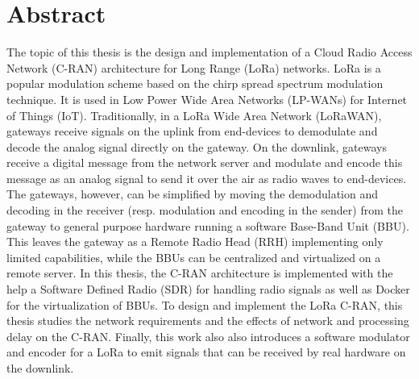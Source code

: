 \chapter*{Abstract}


The topic of this thesis is the design and implementation of a Cloud Radio Access Network (C-RAN) architecture for Long Range (LoRa) networks. 
LoRa is a popular modulation scheme based on the chirp spread spectrum modulation technique. 
It is used in Low Power Wide Area Networks (LP-WANs) for Internet of Things (IoT). 
Traditionally, in a LoRa Wide Area Network (LoRaWAN), gateways receive signals on the uplink from end-devices to demodulate and decode the analog signal directly on the gateway.
On the downlink, gateways receive a digital message from the network server and modulate and encode this message as an analog signal to send it over the air as radio waves to end-devices.
The gateways, however, can be simplified by moving the demodulation and decoding in the receiver (resp. modulation and encoding in the sender) from the gateway to general purpose hardware running a software Base-Band Unit (BBU). 
This leaves the gateway as a Remote Radio Head (RRH) implementing only limited capabilities, while the BBUs can be centralized and virtualized on a remote server.
In this thesis, the C-RAN architecture is implemented with the help a Software Defined Radio (SDR) for handling radio signals as well as Docker for the virtualization of BBUs. 
To design and implement the LoRa C-RAN, this thesis studies the network requirements and the effects of network and processing delay on the C-RAN.
Finally, this work also also introduces a software modulator and encoder for a LoRa to emit signals that can be received by real hardware on the downlink. 

\newpage


